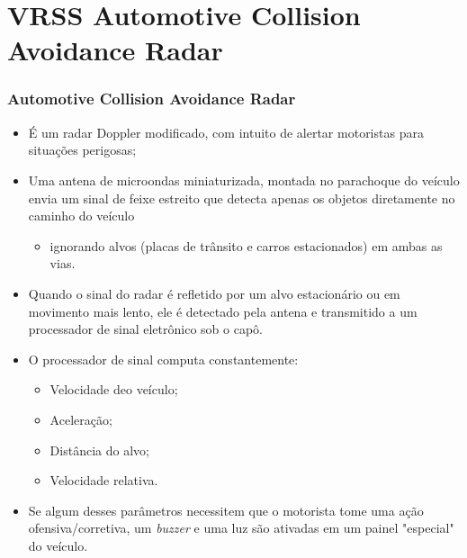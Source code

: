 \documentclass[xcolor=dvipsnames, aspectratio=169]{beamer}
\begin{document}
\section[VRSS Automotive Collision Avoidance Radar]{VRSS Automotive Collision Avoidance Radar} 

\begin{frame}
\frametitle{Automotive Collision Avoidance Radar}
	\begin{itemize}
		\item É um radar Doppler modificado, com intuito de alertar motoristas para situações perigosas;
		\item Uma antena de microondas miniaturizada, montada no parachoque do veículo envia um sinal de feixe estreito que detecta apenas os objetos diretamente no caminho do veículo
        \begin{itemize}
            \item ignorando alvos (placas de trânsito e carros estacionados) em ambas as vias.
        \end{itemize}
        \item Quando o sinal do radar é refletido por um alvo estacionário ou em movimento mais lento, ele é detectado pela antena e transmitido a um processador de sinal eletrônico sob o capô.
        \item O processador de sinal computa constantemente:
        \begin{itemize}
            \item Velocidade deo veículo;
            \item Aceleração;
            \item Distância do alvo;
            \item Velocidade relativa.
        \end{itemize}
        \item Se algum desses parâmetros necessitem que o motorista tome uma ação ofensiva/corretiva, um \textit{buzzer} e uma luz são ativadas em um painel "especial" do veículo.
        \begin{figure}
            \centering

\end{figure}
\end{itemize}
\end{frame}
\end{document}
